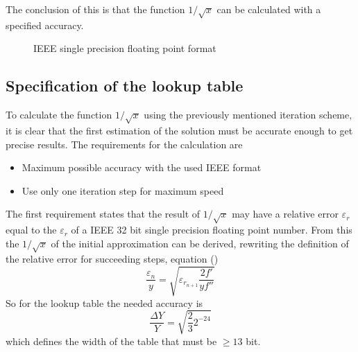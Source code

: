 The conclusion of this is that the function $1/\sqrt{x}$ can be
calculated with a specified accuracy.

\begin{figure}
\begin{center}

\end{center}
\caption{IEEE single precision floating point format}
\label{fig:ieee}
\end{figure}

\subsection{Specification of the lookup table}
To calculate the function $1/\sqrt{x}$ using the previously mentioned
iteration scheme, it is clear that the first estimation of the solution must
be accurate enough to get precise results. The requirements for the
calculation are
\begin{itemize}
\item Maximum possible accuracy with the used IEEE format
\item Use only one iteration step for maximum speed
\end{itemize}

The first requirement states that the result of $1/\sqrt{x}$ may have a
relative error $\varepsilon_{r}$ equal to the $\varepsilon_{r}$ of a IEEE 32
bit single precision floating point number. From this the $1/\sqrt{x}$
of the initial approximation can be derived, rewriting the definition of
the relative error for succeeding steps, equation ()
\begin{equation}
\frac{\varepsilon_{n}}{y} =
\sqrt{\varepsilon_ {r_{n+1}} \frac{2f'}{yf''}}
\end{equation}
So for the lookup table the needed accuracy is
\begin{equation}
\frac{\Delta Y}{Y} = \sqrt{\frac{2}{3} 2^{-24}}
\label{eqn:accy}
\end{equation}
which defines the width of the table that must be $\geq 13$ bit.

